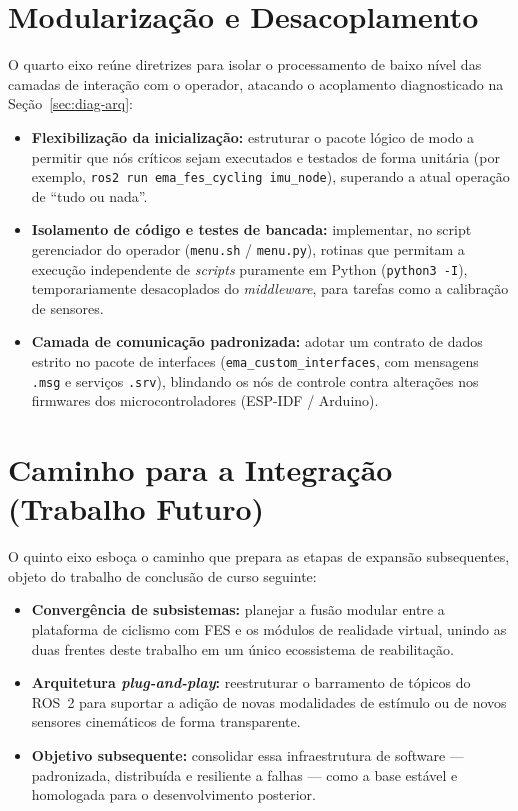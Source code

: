 \section{Modularização e Desacoplamento}
\label{sec:prop-modularizacao}

O quarto eixo reúne diretrizes para isolar o processamento de baixo nível das camadas de
interação com o operador, atacando o acoplamento diagnosticado na Seção~\ref{sec:diag-arq}:

\begin{itemize}
	\item \textbf{Flexibilização da inicialização:} estruturar o pacote lógico de modo a
	      permitir que nós críticos sejam executados e testados de forma unitária (por
	      exemplo, \texttt{ros2 run ema\_fes\_cycling imu\_node}), superando a atual operação
	      de ``tudo ou nada''.
	\item \textbf{Isolamento de código e testes de bancada:} implementar, no script
	      gerenciador do operador (\texttt{menu.sh} / \texttt{menu.py}), rotinas que permitam
	      a execução independente de \emph{scripts} puramente em Python (\texttt{python3 -I}),
	      temporariamente desacoplados do \emph{middleware}, para tarefas como a calibração de
	      sensores.
	\item \textbf{Camada de comunicação padronizada:} adotar um contrato de dados estrito no
	      pacote de interfaces (\texttt{ema\_custom\_interfaces}, com mensagens \texttt{.msg} e
	      serviços \texttt{.srv}), blindando os nós de controle contra alterações nos
	      firmwares dos microcontroladores (ESP-IDF / Arduino).
\end{itemize}

\section{Caminho para a Integração (Trabalho Futuro)}
\label{sec:prop-integracao}

O quinto eixo esboça o caminho que prepara as etapas de expansão subsequentes, objeto do
trabalho de conclusão de curso seguinte:

\begin{itemize}
	\item \textbf{Convergência de subsistemas:} planejar a fusão modular entre a plataforma de
	      ciclismo com FES e os módulos de realidade virtual, unindo as duas frentes deste
	      trabalho em um único ecossistema de reabilitação.
	\item \textbf{Arquitetura \emph{plug-and-play}:} reestruturar o barramento de tópicos do
	      ROS~2 para suportar a adição de novas modalidades de estímulo ou de novos sensores
	      cinemáticos de forma transparente.
	\item \textbf{Objetivo subsequente:} consolidar essa infraestrutura de software ---
	      padronizada, distribuída e resiliente a falhas --- como a base estável e homologada
	      para o desenvolvimento posterior.
\end{itemize}

